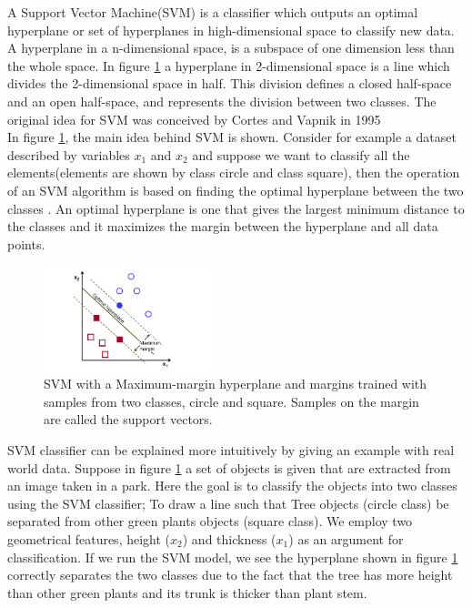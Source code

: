A Support Vector Machine(SVM) is a classifier which outputs an optimal hyperplane or set of hyperplanes in high-dimensional space to classify new data. A hyperplane in a n-dimensional space, is a subspace of one dimension less than the whole space. In figure \ref{fig:SVM} a hyperplane in 2-dimensional space is a line which divides the 2-dimensional space in half. This division defines a closed half-space and an open half-space, and represents the division between two classes. The original idea for SVM was conceived by Cortes and Vapnik in 1995 \cite{cortes1995support} \\
In figure \ref{fig:SVM}, the main idea behind SVM is shown. Consider for example a dataset described by variables $x_1$ and $x_2$ and suppose we want to classify all the elements(elements are shown by class circle and class square), then the operation of an SVM algorithm is based on finding the optimal hyperplane between the two classes \cite{opencv_library}. An optimal hyperplane is one that gives the largest minimum distance to the classes and it maximizes the margin between the hyperplane and all data points. %

\begin{figure}[H]
    \includegraphics[width=0.45\textwidth]{./img/SVM.png}
    \caption{\footnotesize{SVM with a Maximum-margin hyperplane and margins trained with samples from two classes, circle and square. Samples on the margin are called the support vectors.\cite{wiki:SVM}}}
    \label{fig:SVM}
\end{figure}

SVM classifier can be explained more intuitively by giving an example with real world data. Suppose in figure \ref{fig:SVM} a set of objects is given that are extracted from an image taken in a park. Here the goal is to classify the objects into two classes using the SVM classifier; To draw a line such that Tree objects (circle class) be separated from other  green plants objects (square class). We employ two geometrical features, height ($x_2$) and thickness ($x_1$) as an argument for classification. If we run the SVM model, we see the hyperplane shown in figure \ref{fig:SVM} correctly separates the two classes due to the fact that the tree has more height than other green plants and its trunk is thicker than plant stem.\\  

